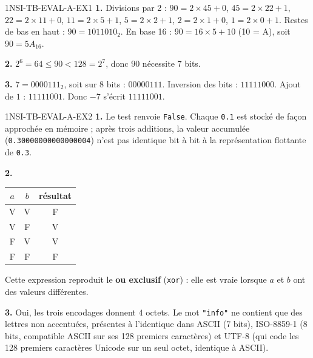 \begin{corrige}{1NSI-TB-EVAL-A-EX1}
\textbf{1.} Divisions par 2 : $90=2\times45+0$, $45=2\times22+1$, $22=2\times11+0$,
$11=2\times5+1$, $5=2\times2+1$, $2=2\times1+0$, $1=2\times0+1$. Restes de bas en haut :
$90=1011010_2$. En base 16 : $90=16\times5+10$ (10 = A), soit $90=5A_{16}$.

\textbf{2.} $2^6=64\leqslant90<128=2^7$, donc $90$ nécessite $7$ bits.

\textbf{3.} $7=0000111_2$, soit sur 8 bits : $00000111$. Inversion des bits :
$11111000$. Ajout de $1$ : $11111001$. Donc $-7$ s'écrit $11111001$.
\end{corrige}

\begin{corrige}{1NSI-TB-EVAL-A-EX2}
\textbf{1.} Le test renvoie \lstinline{False}. Chaque \lstinline{0.1} est stocké de façon
approchée en mémoire ; après trois additions, la valeur accumulée
(\lstinline{0.30000000000000004}) n'est pas identique bit à bit à la représentation
flottante de \lstinline{0.3}.

\textbf{2.}
\begin{center}
\begin{tabular}{cc|c}
  $a$ & $b$ & résultat \\\hline
  V & V & F \\
  V & F & V \\
  F & V & V \\
  F & F & F \\
\end{tabular}
\end{center}
Cette expression reproduit le \textbf{ou exclusif} (\lstinline{xor}) : elle est vraie
lorsque $a$ et $b$ ont des valeurs différentes.

\textbf{3.} Oui, les trois encodages donnent $4$ octets. Le mot \lstinline{"info"} ne
contient que des lettres non accentuées, présentes à l'identique dans ASCII (7 bits),
ISO-8859-1 (8 bits, compatible ASCII sur ses 128 premiers caractères) et UTF-8 (qui code les
128 premiers caractères Unicode sur un seul octet, identique à ASCII).
\end{corrige}
